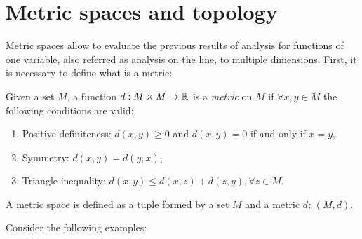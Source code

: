 \chapter{Metric spaces and topology}

Metric spaces allow to evaluate the previous results of analysis for functions of one variable, also referred as analysis on the line, to multiple dimensions. First, it is necessary to define what is a metric:

\begin{definition}[Metric]
    Given a set $M$, a function $d: M \times M \to \mathbb{R}$ is a \emph{metric} on $M$ if $\forall x, y \in M$ the following conditions are valid:
    \begin{enumerate}
        \item Positive definiteness: $d(x,y) \geq 0$ and $d(x,y) = 0$ if and only if $x=y$,
        \item Symmetry: $d(x,y) = d(y,x)$,
        \item Triangle inequality: $d(x,y) \leq d(x,z) + d(z,y), \forall z \in M$.
    \end{enumerate}
\end{definition}

A metric space is defined as a tuple formed by a set $M$ and a metric $d$: $(M, d)$.

Consider the following examples:

